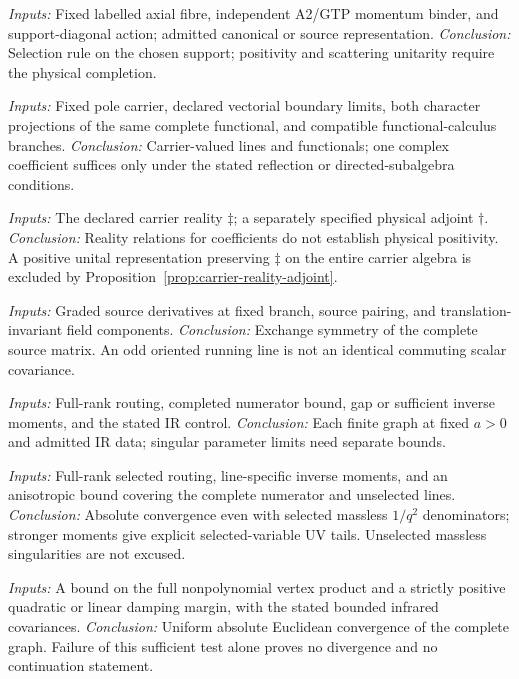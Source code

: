 \documentclass[final,5p,times,twocolumn,numbers,nopreprintline]{elsarticle}
\numberwithin{equation}{section}
\theoremstyle{definition}
\theoremstyle{remark}
\begin{document}
\begin{description}[style=nextline]
\item[Plane binding.] \textit{Inputs:} Fixed labelled axial fibre, independent A2/GTP momentum binder,
and support-diagonal action; admitted canonical or source representation.
\textit{Conclusion:} Selection rule on the chosen support; positivity and scattering
unitarity require the physical completion.

\item[Carrier reconstruction.] \textit{Inputs:} Fixed pole carrier,
declared vectorial boundary limits, both character projections of
the same complete functional, and compatible functional-calculus branches.
\textit{Conclusion:} Carrier-valued lines and functionals; one complex coefficient suffices
only under the stated reflection or directed-subalgebra conditions.

\item[Reality and adjoints.] \textit{Inputs:} The declared carrier
reality \(\ddagger\); a separately specified physical adjoint
\(\dagger\). \textit{Conclusion:} Reality relations for coefficients
do not establish physical positivity. A positive unital representation
preserving \(\ddagger\) on the entire carrier algebra is excluded by
Proposition~\ref{prop:carrier-reality-adjoint}.

\item[Source covariance.] \textit{Inputs:} Graded source derivatives at fixed branch, source pairing, and
translation-invariant field components.
\textit{Conclusion:} Exchange symmetry of the complete source matrix. An odd oriented
running line is not an identical commuting scalar covariance.

\item[Global graph convergence.] \textit{Inputs:} Full-rank routing, completed numerator bound, gap or sufficient
inverse moments, and the stated IR control.
\textit{Conclusion:} Each finite graph at fixed \(a>0\) and admitted IR data;
singular parameter limits need separate bounds.

\item[Optimized line coverage.] \textit{Inputs:} Full-rank
selected routing, line-specific inverse moments, and an anisotropic
bound covering the complete numerator and unselected lines.
\textit{Conclusion:} Absolute convergence even with selected massless
$1/q^2$ denominators; stronger moments give explicit selected-variable
UV tails. Unselected massless singularities are not excused.

\item[Residual damping.]
\textit{Inputs:} A bound on the full nonpolynomial vertex product and
a strictly positive quadratic or linear damping margin, with the
stated bounded infrared covariances.
\textit{Conclusion:} Uniform absolute Euclidean convergence of the
complete graph. Failure of this sufficient test alone proves no
divergence and no continuation statement.


\end{description}
\end{document}
